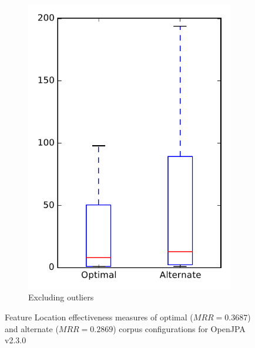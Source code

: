 \begin{figure}
\begin{subfigure}{.4\textwidth}
        \includegraphics[height=0.4\textheight]{figures/combo/flt_rq2_openjpa_no_outlier}
        \caption{Excluding outliers}\label{fig:combo:flt:rq2:openjpa_no_outlier}
    \end{subfigure}
\caption[Feature Location effectiveness measures of optimal and alternate corpus configurations for OpenJPA v2.3.0]%
{Feature Location effectiveness measures of optimal ($MRR=0.3687$) and alternate ($MRR=0.2869$) corpus configurations for OpenJPA v2.3.0}
\label{fig:combo:flt:rq2:openjpa}
\end{figure}
